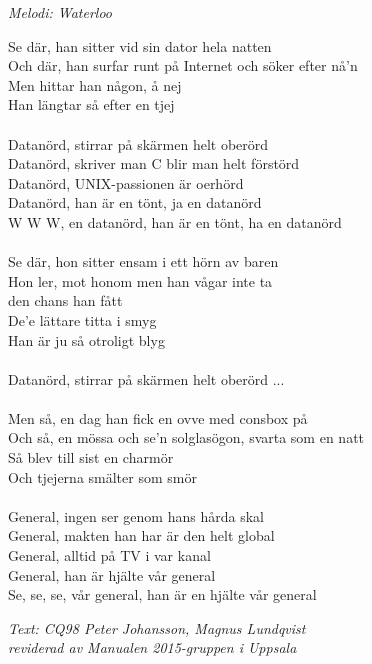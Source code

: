 {\footnotesize\textit{Melodi: Waterloo}}\par
\vspace{10pt}
Se där, han sitter vid sin dator hela natten\\
Och där, han surfar runt på Internet och söker efter nå'n\\
Men hittar han någon, å nej\\
Han längtar så efter en tjej\\
\\
Datanörd, stirrar på skärmen helt oberörd\\
Datanörd, skriver man C blir man helt förstörd\\
Datanörd, UNIX-passionen är oerhörd\\
Datanörd, han är en tönt, ja en datanörd\\
W W W, en datanörd, han är en tönt, ha en datanörd\\
\\
Se där, hon sitter ensam i ett hörn av baren\\
Hon ler, mot honom men han vågar inte ta\\
den chans han fått\\
De'e lättare titta i smyg\\
Han är ju så otroligt blyg\\
\\
Datanörd, stirrar på skärmen helt oberörd ...\\
\\
Men så, en dag han fick en ovve med consbox på\\
Och så, en mössa och se'n solglasögon, svarta som en natt\\
Så blev till sist en charmör\\
Och tjejerna smälter som smör\\
\\
General, ingen ser genom hans hårda skal\\
General, makten han har är den helt global\\
General, alltid på TV i var kanal\\
General, han är hjälte vår general\\
Se, se, se, vår general, han är en hjälte vår general
\par
\vspace{10pt}
{\footnotesize\textit{Text: CQ98 Peter Johansson, Magnus Lundqvist \\
					 reviderad av Manualen 2015-gruppen i Uppsala}}
